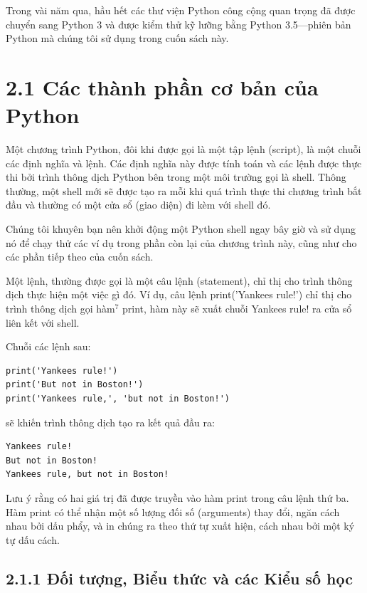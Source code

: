 Trong vài năm qua, hầu hết các thư viện Python công cộng quan trọng đã được chuyển sang Python 3 và được kiểm thử kỹ lưỡng bằng Python 3.5—phiên bản Python mà chúng tôi sử dụng trong cuốn sách này.

\section*{2.1 Các thành phần cơ bản của Python}

\noindent \indent Một chương trình Python, đôi khi được gọi là một tập lệnh (script), là một chuỗi các định nghĩa và lệnh. Các định nghĩa này được tính toán và các lệnh được thực thi bởi trình thông dịch Python bên trong một môi trường gọi là shell. Thông thường, một shell mới sẽ được tạo ra mỗi khi quá trình thực thi chương trình bắt đầu và thường có một cửa sổ (giao diện) đi kèm với shell đó.

Chúng tôi khuyên bạn nên khởi động một Python shell ngay bây giờ và sử dụng nó để chạy thử các ví dụ trong phần còn lại của chương trình này, cũng như cho các phần tiếp theo của cuốn sách.

Một lệnh, thường được gọi là một câu lệnh (statement), chỉ thị cho trình thông dịch thực hiện một việc gì đó. Ví dụ, câu lệnh print('Yankees rule!') chỉ thị cho trình thông dịch gọi hàm$^7$ print, hàm này sẽ xuất chuỗi Yankees rule! ra cửa sổ liên kết với shell.

Chuỗi các lệnh sau:

\begin{verbatim}
print('Yankees rule!')
print('But not in Boston!')
print('Yankees rule,', 'but not in Boston!')
\end{verbatim}

sẽ khiến trình thông dịch tạo ra kết quả đầu ra:

\begin{verbatim}
Yankees rule!
But not in Boston!
Yankees rule, but not in Boston!
\end{verbatim}

Lưu ý rằng có hai giá trị đã được truyền vào hàm print trong câu lệnh thứ ba. Hàm print có thể nhận một số lượng đối số (arguments) thay đổi, ngăn cách nhau bởi dấu phẩy, và in chúng ra theo thứ tự xuất hiện, cách nhau bởi một ký tự dấu cách.

\subsection*{2.1.1 Đối tượng, Biểu thức và các Kiểu số học}

